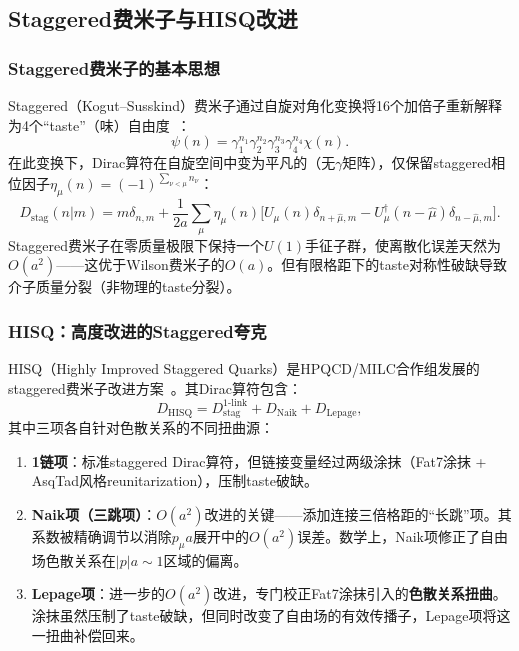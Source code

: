 \documentclass[12pt,a4paper]{ctexart}
\theoremstyle{definition}
\begin{document}
\subsection{Staggered费米子与HISQ改进}

\subsubsection{Staggered费米子的基本思想}

Staggered（Kogut--Susskind）费米子通过自旋对角化变换将16个加倍子重新解释为4个``taste''（味）自由度~\cite{GattringerLang2010,fermionFormulations2026}：
\begin{equation}
    \psi(n) = \gamma_1^{n_1} \gamma_2^{n_2} \gamma_3^{n_3} \gamma_4^{n_4} \chi(n).
\end{equation}
在此变换下，Dirac算符在自旋空间中变为平凡的（无$\gamma$矩阵），仅保留staggered相位因子$\eta_\mu(n) = (-1)^{\sum_{\nu<\mu}n_\nu}$：
\begin{equation}
    D_{\text{stag}}(n|m) = m\delta_{n,m} + \frac{1}{2a}\sum_\mu \eta_\mu(n)\bigl[U_\mu(n)\delta_{n+\hat{\mu},m} - U_\mu^\dagger(n-\hat{\mu})\delta_{n-\hat{\mu},m}\bigr].
\end{equation}
Staggered费米子在零质量极限下保持一个$U(1)$手征子群，使离散化误差天然为$O(a^2)$——这优于Wilson费米子的$O(a)$。但有限格距下的taste对称性破缺导致介子质量分裂（非物理的taste分裂）。

\subsubsection{HISQ：高度改进的Staggered夸克}

HISQ（Highly Improved Staggered Quarks）是HPQCD/MILC合作组发展的staggered费米子改进方案~\cite{fermionFormulations2026}。其Dirac算符包含：
\begin{equation}
    D_{\text{HISQ}} = D_{\text{stag}}^{\text{1-link}} + D_{\text{Naik}} + D_{\text{Lepage}},
\end{equation}
其中三项各自针对色散关系的不同扭曲源：

\begin{enumerate}[leftmargin=*]
    \item \textbf{1链项}：标准staggered Dirac算符，但链接变量经过两级涂抹（Fat7涂抹 + AsqTad风格reunitarization），压制taste破缺。
    \item \textbf{Naik项（三跳项）}：$O(a^2)$改进的关键——添加连接三倍格距的``长跳''项。其系数被精确调节以消除$p_\mu a$展开中的$O(a^2)$误差。数学上，Naik项修正了自由场色散关系在$|p|a \sim 1$区域的偏离。
    \item \textbf{Lepage项}：进一步的$O(a^2)$改进，专门校正Fat7涂抹引入的\textbf{色散关系扭曲}。涂抹虽然压制了taste破缺，但同时改变了自由场的有效传播子，Lepage项将这一扭曲补偿回来。
\end{enumerate}
\end{document}

